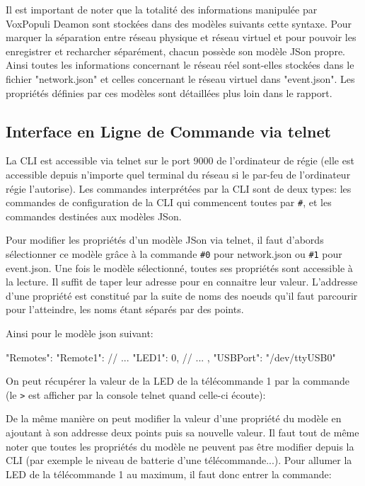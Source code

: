 \documentclass{Rapport}
\begin{document}
Il est important de noter que la totalité des informations manipulée par VoxPopuli Deamon sont stockées dans des modèles suivants cette syntaxe. Pour marquer la séparation entre réseau physique et réseau virtuel et pour pouvoir les enregistrer et recharcher séparément, chacun possède son modèle JSon propre. Ainsi toutes les informations concernant le réseau réel sont-elles stockées dans le fichier "network.json" et celles concernant le réseau virtuel dans "event.json".  Les propriétés définies par ces modèles sont détaillées plus loin dans le rapport.

\subsection*{Interface en Ligne de Commande via telnet}
La CLI est accessible via telnet sur le port 9000 de l'ordinateur de régie (elle est accessible depuis n'importe quel terminal du réseau si le par-feu de l'ordinateur régie l'autorise). Les commandes interprétées par la CLI sont de deux types: les commandes de configuration de la CLI qui commencent toutes par \verb|#|, et les commandes destinées aux modèles JSon.

Pour modifier les propriétés d'un modèle JSon via telnet, il faut d'abords sélectionner ce modèle grâce à la commande \verb|#0| pour network.json ou \verb|#1| pour event.json. Une fois le modèle sélectionné, toutes ses propriétés sont accessible à la lecture. Il suffit de taper leur adresse pour en connaitre leur valeur. L'addresse d'une propriété est constitué par la suite de noms des noeuds qu'il faut parcourir pour l'atteindre, les noms étant séparés par des points.

Ainsi pour le modèle json suivant:
\begin{Cpp}
{
	"Remotes": {
		"Remote1": {
			// ...
			"LED1": 0,
			// ...
		}
	},
	"USBPort": "/dev/ttyUSB0"
}
\end{Cpp}

On peut récupérer la valeur de la LED de la télécommande 1 par la commande (le \verb|>| est afficher par la console telnet quand celle-ci écoute):


De la même manière on peut modifier la valeur d'une propriété du modèle en ajoutant à son addresse deux points puis sa nouvelle valeur. Il faut tout de même noter que toutes les propriétés du modèle ne peuvent pas être modifier depuis la CLI (par exemple le niveau de batterie d'une télécommande...). Pour allumer la LED de la télécommande 1 au maximum, il faut donc entrer la commande:
\end{document}
